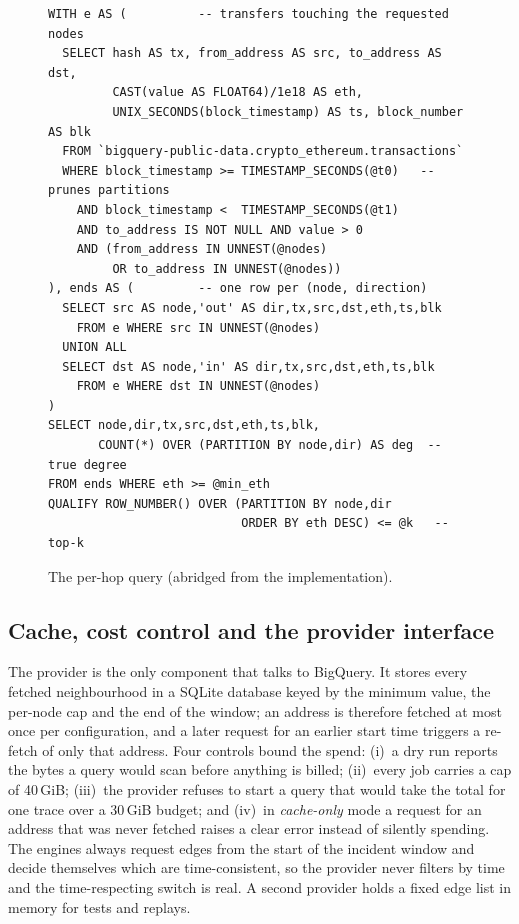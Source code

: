 \begin{figure}[H]
\centering\footnotesize
\begin{minipage}{0.97\textwidth}
\begin{verbatim}
WITH e AS (          -- transfers touching the requested nodes
  SELECT hash AS tx, from_address AS src, to_address AS dst,
         CAST(value AS FLOAT64)/1e18 AS eth,
         UNIX_SECONDS(block_timestamp) AS ts, block_number AS blk
  FROM `bigquery-public-data.crypto_ethereum.transactions`
  WHERE block_timestamp >= TIMESTAMP_SECONDS(@t0)   -- prunes partitions
    AND block_timestamp <  TIMESTAMP_SECONDS(@t1)
    AND to_address IS NOT NULL AND value > 0
    AND (from_address IN UNNEST(@nodes)
         OR to_address IN UNNEST(@nodes))
), ends AS (         -- one row per (node, direction)
  SELECT src AS node,'out' AS dir,tx,src,dst,eth,ts,blk
    FROM e WHERE src IN UNNEST(@nodes)
  UNION ALL
  SELECT dst AS node,'in' AS dir,tx,src,dst,eth,ts,blk
    FROM e WHERE dst IN UNNEST(@nodes)
)
SELECT node,dir,tx,src,dst,eth,ts,blk,
       COUNT(*) OVER (PARTITION BY node,dir) AS deg  -- true degree
FROM ends WHERE eth >= @min_eth
QUALIFY ROW_NUMBER() OVER (PARTITION BY node,dir
                           ORDER BY eth DESC) <= @k   -- top-k
\end{verbatim}
\end{minipage}
\caption{The per-hop query (abridged from the implementation).}
\label{lst:hopsql}
\end{figure}

\subsection{Cache, cost control and the provider interface}
The provider is the only component that talks to BigQuery. It stores every fetched neighbourhood in a SQLite database keyed by the minimum value, the per-node cap and the end of the window; an address is therefore fetched at most once per configuration, and a later request for an earlier start time triggers a re-fetch of only that address. Four controls bound the spend: (i)~a dry run reports the bytes a query would scan before anything is billed; (ii)~every job carries a  cap of 40\,GiB; (iii)~the provider refuses to start a query that would take the total for one trace over a 30\,GiB budget; and (iv)~in \emph{cache-only} mode a request for an address that was never fetched raises a clear error instead of silently spending. The engines always request edges from the start of the incident window and decide themselves which are time-consistent, so the provider never filters by time and the time-respecting switch is real. A second provider holds a fixed edge list in memory for tests and replays.


